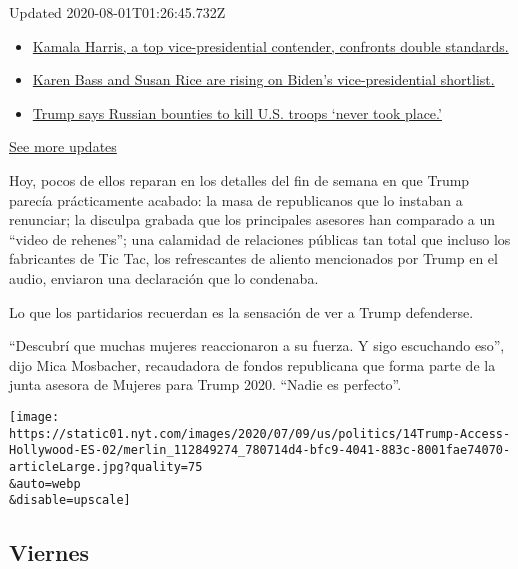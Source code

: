 Updated 2020-08-01T01:26:45.732Z

\begin{itemize}
\tightlist
\item
  \href{https://www.nytimes.com/2020/07/31/us/elections/biden-vs-trump.html?action=click\&pgtype=Article\&state=default\&region=MAIN_CONTENT_1\&context=storylines_live_updates\#link-29fdff45}{Kamala
  Harris, a top vice-presidential contender, confronts double
  standards.}
\item
  \href{https://www.nytimes.com/2020/07/31/us/elections/biden-vs-trump.html?action=click\&pgtype=Article\&state=default\&region=MAIN_CONTENT_1\&context=storylines_live_updates\#link-13ec3d9c}{Karen
  Bass and Susan Rice are rising on Biden's vice-presidential
  shortlist.}
\item
  \href{https://www.nytimes.com/2020/07/31/us/elections/biden-vs-trump.html?action=click\&pgtype=Article\&state=default\&region=MAIN_CONTENT_1\&context=storylines_live_updates\#link-49e9a016}{Trump
  says Russian bounties to kill U.S. troops `never took place.'}
\end{itemize}

\href{https://www.nytimes.com/2020/07/31/us/elections/biden-vs-trump.html?action=click\&pgtype=Article\&state=default\&region=MAIN_CONTENT_1\&context=storylines_live_updates}{See
more updates}

Hoy, pocos de ellos reparan en los detalles del fin de semana en que
Trump parecía prácticamente acabado: la masa de republicanos que lo
instaban a renunciar; la disculpa grabada que los principales asesores
han comparado a un ``video de rehenes''; una calamidad de relaciones
públicas tan total que incluso los fabricantes de Tic Tac, los
refrescantes de aliento mencionados por Trump en el audio, enviaron una
declaración que lo condenaba.

Lo que los partidarios recuerdan es la sensación de ver a Trump
defenderse.

``Descubrí que muchas mujeres reaccionaron a su fuerza. Y sigo
escuchando eso'', dijo Mica Mosbacher, recaudadora de fondos republicana
que forma parte de la junta asesora de Mujeres para Trump 2020. ``Nadie
es perfecto''.

\texttt{[image: https://static01.nyt.com/images/2020/07/09/us/politics/14Trump-Access-Hollywood-ES-02/merlin\_112849274\_780714d4-bfc9-4041-883c-8001fae74070-articleLarge.jpg?quality=75\\\&auto=webp\\\&disable=upscale]}

\hypertarget{viernes}{%
\subsection{Viernes}\label{viernes}}

